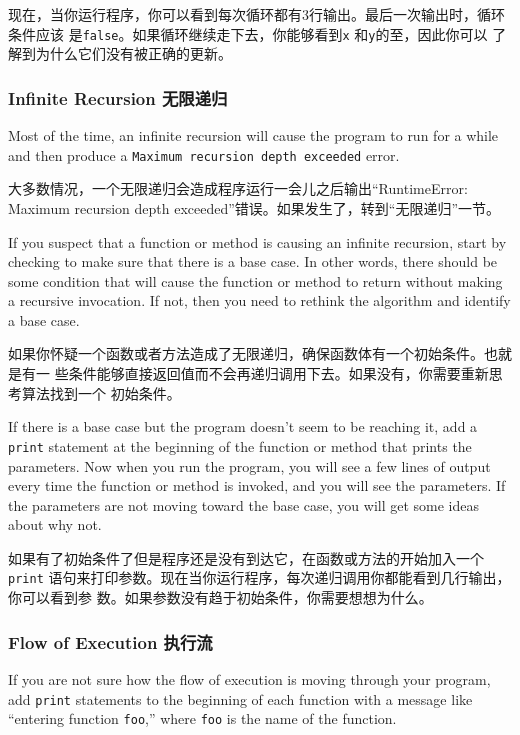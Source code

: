\documentclass[10pt]{book}
\begin{document}
\begin{CJK}{UTF8}{gbsn}
现在，当你运行程序，你可以看到每次循环都有3行输出。最后一次输出时，循环条件应该
是{\tt false}。如果循环继续走下去，你能够看到{\tt x} 和{\tt y}的至，因此你可以
了解到为什么它们没有被正确的更新。

\subsubsection{Infinite Recursion 无限递归}

Most of the time, an infinite recursion will cause the program to run
for a while and then produce a {\tt Maximum recursion depth exceeded}
error.

大多数情况，一个无限递归会造成程序运行一会儿之后输出``RuntimeError: Maximum
recursion depth exceeded''错误。如果发生了，转到``无限递归''一节。

If you suspect that a function or method is causing an infinite
recursion, start by checking to make sure that there is a base case.
In other words, there should be some condition that will cause the
function or method to return without making a recursive invocation.
If not, then you need to rethink the algorithm and identify a base
case.

如果你怀疑一个函数或者方法造成了无限递归，确保函数体有一个初始条件。也就是有一
些条件能够直接返回值而不会再递归调用下去。如果没有，你需要重新思考算法找到一个
初始条件。

If there is a base case but the program doesn't seem to be reaching
it, add a {\tt print} statement at the beginning of the function or method
that prints the parameters.  Now when you run the program, you will see
a few lines of output every time the function or method is invoked,
and you will see the parameters.  If the parameters are not moving
toward the base case, you will get some ideas about why not.

如果有了初始条件了但是程序还是没有到达它，在函数或方法的开始加入一个{\tt print}
语句来打印参数。现在当你运行程序，每次递归调用你都能看到几行输出，你可以看到参
数。如果参数没有趋于初始条件，你需要想想为什么。

\subsubsection{Flow of Execution 执行流}

If you are not sure how the flow of execution is moving through
your program, add {\tt print} statements to the beginning of each
function with a message like ``entering function {\tt foo},'' where
{\tt foo} is the name of the function.


\end{CJK}
\end{document}
